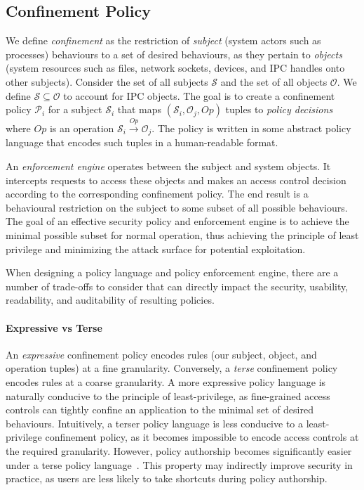 \subsection{Confinement Policy}

We define \textit{confinement} as the restriction of \textit{subject} (system actors such
as processes) behaviours to a set of desired behaviours, as they pertain to
\textit{objects} (system resources such as files, network sockets, devices, and IPC
handles onto other subjects). Consider the set of all subjects $\mathcal{S}$ and the set
of all objects $\mathcal{O}$. We define $\mathcal{S} \subseteq \mathcal{O}$ to account for
IPC objects. The goal is to create a confinement policy $\mathcal{P}_i$ for a subject
$\mathcal{S}_i$ that maps $(\mathcal{S}_i, \mathcal{O}_j, Op)$ tuples to \textit{policy
decisions} where $Op$ is an operation $\mathcal{S}_i \xrightarrow{Op} \mathcal{O}_j$.  The
policy is written in some abstract policy language that encodes such tuples in
a human-readable format.

An \textit{enforcement engine} operates between the subject and system objects. It
intercepts requests to access these objects and makes an access control decision according
to the corresponding confinement policy. The end result is a behavioural restriction on
the subject to some subset of all possible behaviours. The goal of an effective security policy
and enforcement engine is to achieve the minimal possible subset for normal operation,
thus achieving the principle of least privilege and minimizing the attack surface for
potential exploitation.

When designing a policy language and policy enforcement engine, there are a number of
trade-offs to consider that can directly impact the security, usability, readability, and
auditability of resulting policies.

\paragraph*{Expressive vs Terse} An \textit{expressive} confinement policy encodes rules
(our subject, object, and operation tuples) at a fine granularity. Conversely,
a \textit{terse} confinement policy encodes rules at a coarse granularity. A more
expressive policy language is naturally conducive to the principle of least-privilege, as
fine-grained access controls can tightly confine an application to the minimal set of
desired behaviours.  Intuitively, a terser policy language is less conducive to
a least-privilege confinement policy, as it becomes impossible to encode access controls
at the required granularity. However, policy authorship becomes significantly easier under
a terse policy language~\cite{schreuders2012_towards}. This property may indirectly
improve security in practice, as users are less likely to take shortcuts during policy
authorship.

